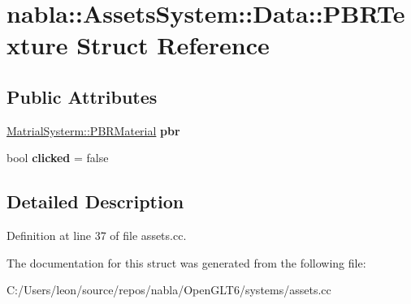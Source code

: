 \hypertarget{structnabla_1_1_assets_system_1_1_data_1_1_p_b_r_texture}{}\section{nabla\+::Assets\+System\+::Data\+::P\+B\+R\+Texture Struct Reference}
\label{structnabla_1_1_assets_system_1_1_data_1_1_p_b_r_texture}
\subsection*{Public Attributes}
\begin{DoxyCompactItemize}
\item 
\mbox{\label{structnabla_1_1_assets_system_1_1_data_1_1_p_b_r_texture_a29eaedfd01c843cd9cee61741880af7e}} 
\mbox{\hyperlink{structnabla_1_1_matrial_systerm_1_1_p_b_r_material}{Matrial\+Systerm\+::\+P\+B\+R\+Material}} {\bfseries pbr}
\item 
\mbox{\label{structnabla_1_1_assets_system_1_1_data_1_1_p_b_r_texture_a16ec85edcdd0481580049226272a5764}} 
bool {\bfseries clicked} = false
\end{DoxyCompactItemize}


\subsection{Detailed Description}


Definition at line 37 of file assets.\+cc.



The documentation for this struct was generated from the following file\+:\begin{DoxyCompactItemize}
\item 
C\+:/\+Users/leon/source/repos/nabla/\+Open\+G\+L\+T6/systems/assets.\+cc\end{DoxyCompactItemize}
